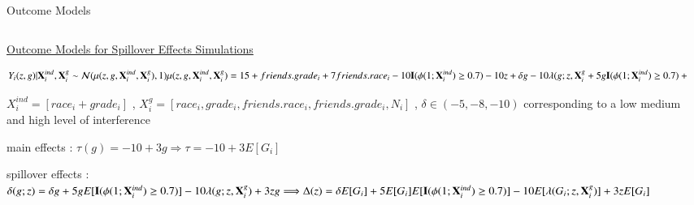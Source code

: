\documentclass[notes,11pt, aspectratio=169]{beamer}
\begin{document}
\begin{frame}{Outcome Models }
\begin{columns}[T] %
\begin{column}{1\textwidth}
\begin{wideitemize}
    \item \underline{Outcome Models for Spillover Effects Simulations}
    \begin{center}
    \begin{equation*}
        Y_i(z,g)|\mathbf{X}_{i}^{ind} , \mathbf{X}_{i}^{g}  \sim \mathcal{N}(\mu(z,g,\mathbf{X}_{i}^{ind},\mathbf{X}_{i}^{g}),1) \\
        \mu(z,g,\mathbf{X}_{i}^{ind},\mathbf{X}_{i}^{g} )  =15+friends.grade_i+7friends.race_i-10\mathbf{I}(\phi(1;\mathbf{X}_{i}^{ind}) \geq 0.7)-10z  +\delta g - 10 \lambda(g;z,\mathbf{X}_{i}^{g} + 5g\mathbf{I}(\phi(1;\mathbf{X}_{i}^{ind}) \geq 0.7) +3zg
    \end{equation*} 
    \end{center}
    \item $X_i^{ind}=[race_i+grade_i]$ , $X_i^{g}=[race_i , grade_i , friends.race_i ,  friends.grade_i , N_i]$ , $\delta \in (-5,-8,-10)$ corresponding to a low medium and high level of interference
    \item main effects : $\tau(g)=-10+3g \Longrightarrow \tau=-10+3E[G_i] $
    \item spillover effects : $\delta(g;z)=\delta g + 5 g E[\mathbf{I}(\phi(1;\mathbf{X}_{i}^{ind}) \geq 0.7)] - 10 \lambda (g;z,\mathbf{X}_{i}^{g})+3zg \\ \Longrightarrow  \Delta(z)=\delta E[G_i] + 5E[G_i]E[\mathbf{I}(\phi(1;\mathbf{X}_{i}^{ind}) \geq 0.7)] - 10E[\lambda (G_i;z,\mathbf{X}_{i}^{g})] + 3z E[G_i] $
\end{wideitemize}
\end{column}%
\hfill%
\begin{column}{.38\textwidth}
  \vspace{20pt}
  \vspace{20pt}
\end{column}%
\end{columns}
\end{frame}
\end{document}
